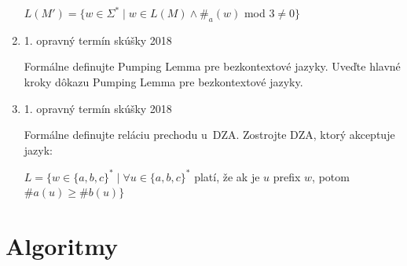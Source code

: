 \documentclass[11pt,a4paper]{article}
\begin{document}
\begin{enumerate}
		$L(M') = \{w \in \Sigma^* \mid w \in L(M) \land \#_a(w)$ mod $3 \neq 0\}$

		\item 1. opravný termín skúšky 2018

		Formálne definujte Pumping Lemma pre bezkontextové jazyky. Uveďte hlavné kroky dôkazu Pumping Lemma pre bezkontextové jazyky.

		\item 1. opravný termín skúšky 2018

		Formálne definujte reláciu prechodu u~DZA. Zostrojte DZA, ktorý akceptuje jazyk:

		$L = \{w \in \{a,b,c\}^* \mid \forall u \in \{a,b,c\}^*$ platí, že ak je $u$ prefix $w$, potom $\#a(u) \geq \#b(u)\}$

	\end{enumerate}

	\section{Algoritmy}
\end{document}
